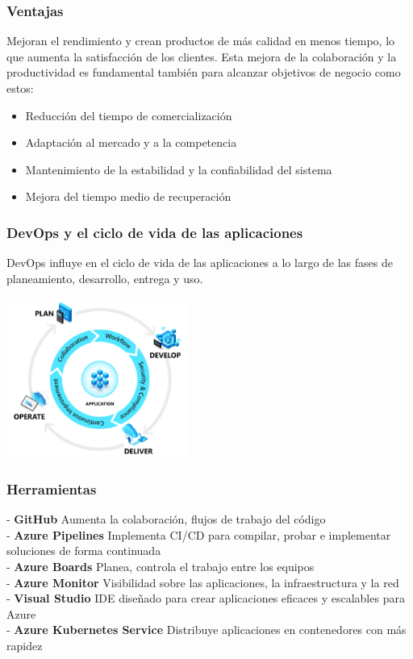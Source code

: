 \documentclass[twoside,twocolumn]{article}
\begin{document}
\subsubsection{Ventajas}

Mejoran el rendimiento y crean productos de más calidad en menos tiempo, lo que aumenta la satisfacción de los clientes. Esta mejora de la colaboración y la productividad es fundamental también para alcanzar objetivos de negocio como estos:

\begin{itemize}
\item Reducción del tiempo de comercialización
\item Adaptación al mercado y a la competencia
\item Mantenimiento de la estabilidad y la confiabilidad del sistema
\item Mejora del tiempo medio de recuperación
\end{itemize}

\subsubsection{DevOps y el ciclo de vida de las aplicaciones}
DevOps influye en el ciclo de vida de las aplicaciones a lo largo de las fases de planeamiento, desarrollo, entrega y uso.

\includegraphics[width = 6cm]{./Imagenes/1.png}


\subsubsection{Herramientas}
- \textbf{GitHub}
Aumenta la colaboración, flujos de trabajo del código\\
- \textbf{Azure Pipelines}
Implementa CI/CD para compilar, probar e implementar soluciones de forma continuada\\
- \textbf{Azure Boards}
Planea, controla el trabajo entre los equipos\\
- \textbf{Azure Monitor}
Visibilidad sobre las aplicaciones, la infraestructura y la red\\
- \textbf{Visual Studio}
IDE diseñado para crear aplicaciones eficaces y escalables para Azure\\
- \textbf{Azure Kubernetes Service}
Distribuye aplicaciones en contenedores con más rapidez
\end{document}
